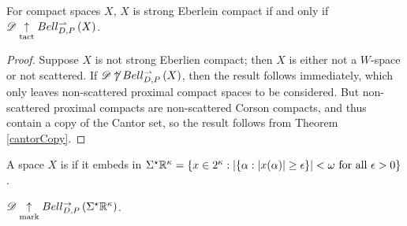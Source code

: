 \documentclass[11pt]{article}
\begin{document}
  \begin{corollary}
    For compact spaces $X$,
    $X$ is strong Eberlein compact if and only if
    $\mathscr{D}\underset{\text{tact}}{\uparrow}Bell_{D,P}^{\rightharpoonup}\left({X}\right)$.
  \end{corollary}

  \begin{proof}
    Suppose $X$ is not strong Eberlien compact; then $X$ is either
    not a $W$-space or not scattered.
    If $\mathscr{D}\not\uparrow Bell_{D,P}^{\rightharpoonup}\left({X}\right)$, then the result follows immediately,
    which only leaves non-scattered proximal compact spaces to be considered.
    But non-scattered proximal compacts are non-scattered Corson compacts,
    and thus contain
    a copy of the Cantor set, so the result follows from Theorem
    \ref{cantorCopy}.
  \end{proof}

  \newpage

  \begin{definition}
    A space $X$ is  if it embeds in
    $
      \Sigma^\star\mathbb{R}^{\kappa}
        =
      \{
        x\in2^\kappa
      :
        |\{\alpha:|x(\alpha)|\geq \epsilon\}|<\omega
        \text{ for all } \epsilon > 0
      \}
    $.
  \end{definition}

  \begin{theorem}
    $\mathscr{D}\underset{\text{mark}}{\uparrow}Bell_{D,P}^{\to}\left({\Sigma^\star\mathbb{R}^{\kappa}}\right)$.
  \end{theorem}
\end{document}
